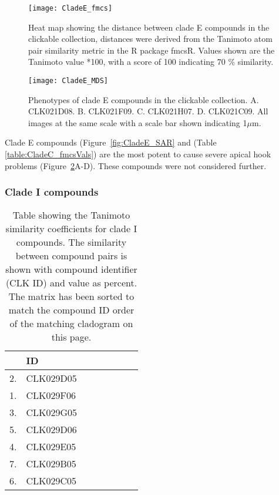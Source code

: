 \begin{figure}\centering
\texttt{[image: CladeE\_fmcs]}
\caption{Heat map showing the distance between clade E compounds in the clickable collection, distances were derived from the Tanimoto atom pair similarity metric in the R package fmcsR. Values shown are the Tanimoto value *100, with a score of 100 indicating 70 {\%} similarity.}
\label{fig:CladeE_fmcs}
\end{figure}

\begin{figure}
\centering
\texttt{[image: CladeE\_MDS]}
\caption{Phenotypes of clade E compounds in the clickable collection. A. CLK021D08. B. CLK021F09. C. CLK021H07. D. CLK021C09. All images at the same scale with a scale bar shown indicating 1$\mu$m.}
\label{fig:CladeE_MDS}
\end{figure}

Clade E compounds (Figure~\ref{fig:CladeE_SAR} and (Table \ref{table:CladeC_fmcsVals}) are the most potent to cause severe apical hook problems (Figure~\ref{fig:CladeE_MDS}A-D). These compounds were not considered further.


\subsubsection{Clade I compounds}


\begin{table}\centering
    \begin{tabular}{|l|l|l|l|l|l|l|l|}
    \hline
   & ID \\ \hline 
2. & CLK029D05  \\ \hline
1. & CLK029F06  \\ \hline
3. & CLK029G05  \\ \hline
5. & CLK029D06  \\ \hline
4. & CLK029E05  \\ \hline
7. & CLK029B05  \\ \hline
6. & CLK029C05  \\ \hline
    \end{tabular}
    \caption {Table showing the Tanimoto similarity coefficients for clade I compounds. The similarity between compound pairs is shown with compound identifier (CLK ID) and value as percent. The matrix has been sorted to match the compound ID order of the matching cladogram on this page.}     
     \label{table:CladeI_fmcsVals}
\end{table}

